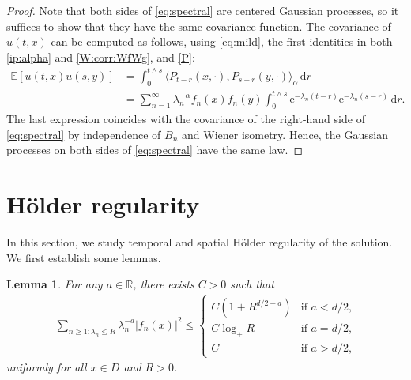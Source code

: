 \documentclass[reqno]{amsart}
\newcommand{\R}{\mathbb R}
\newcommand{\E}{\mathbb E}
\renewcommand{\d}{\mathrm d}
\newcommand{\e}{\mathrm e}
\newcommand{\1}{\mathbf 1}
\numberwithin{equation}{section}
\newtheorem{lemma}[theorem]{Lemma}
\theoremstyle{definition}
\begin{document}
\begin{proof}
Note that both sides of \eqref{eq:spectral} are centered Gaussian processes, so it suffices to show that they have the same covariance function.
The covariance of $u(t,x)$ can be computed as follows, using \eqref{eq:mild}, the first identities in both \eqref{ip:alpha} and \eqref{W:corr:WfWg}, and \eqref{P}:
\begin{align*}
	\E[u(t,x)u(s,y)]
	&=\int_0^{t \wedge s} \langle P_{t-r}(x, \cdot) , P_{s-r}(y,\cdot) \rangle_\alpha\, \d r\\
	&=\sum_{n=1}^\infty\lambda_n^{-\alpha}f_n(x)f_n(y)\int_0^{t\wedge s} \e^{-\lambda_n(t-r)}\e^{-\lambda_n(s-r)}\,\d r.
\end{align*}
The last expression coincides with the covariance of the right-hand side of \eqref{eq:spectral} by independence of $B_n$ and Wiener isometry.
Hence, the Gaussian processes on both sides of \eqref{eq:spectral} have the same law.
\end{proof}

\section{H\"older regularity}\label{sec:regularity}

In this section, we study temporal and spatial H\"older regularity of the solution. 
We first establish some lemmas.

\begin{lemma}\label{lem:spectral:1}
For any $a \in \R$, there exists $C>0$ such that
\begin{align*}
	\sum_{n \ge 1: \lambda_n \le R} \lambda_n^{-a} |f_n(x)|^2 \le 
	\begin{cases}
	C(1+R^{d/2-a}) & \text{if $a<d/2$,}\\
	C\log_+ R & \text{if $a=d/2$,}\\
	C & \text{if $a>d/2$,}
	\end{cases}
\end{align*}
uniformly for all $x \in D$ and $R > 0$.
\end{lemma}
\end{document}
